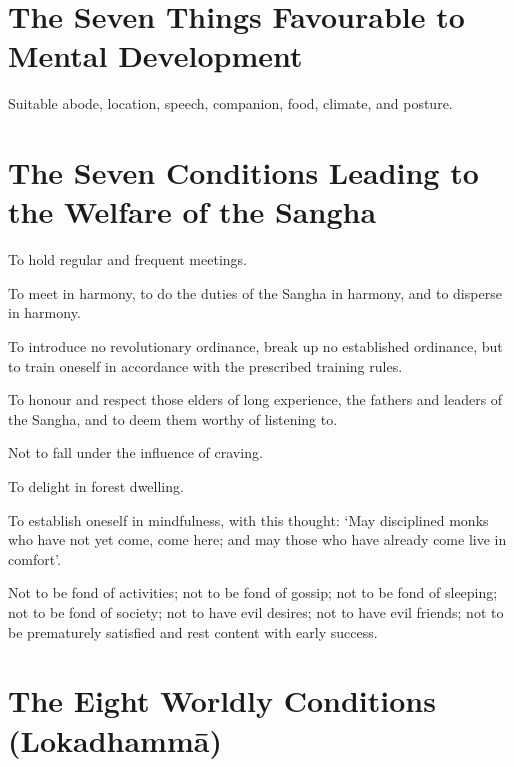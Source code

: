 
\ifhandbookedition
\vspace*{-\baselineskip}
\fi

\section*{The Seven Things Favourable to Mental Development}


Suitable abode, location, speech, companion, food, climate, and posture.


\ifhandbookedition
\vspace*{-\baselineskip}
\fi

\section*{The Seven Conditions Leading to the Welfare of the Sangha}

To hold regular and frequent meetings.

To meet in harmony, to do the duties of the Sangha in harmony, and to disperse
in harmony.

To introduce no revolutionary ordinance, break up no established ordinance, but
to train oneself in accordance with the prescribed training rules.

To honour and respect those elders of long experience, the fathers and leaders
of the Sangha, and to deem them worthy of listening to.

Not to fall under the influence of craving.

To delight in forest dwelling.

To establish oneself in mindfulness, with this thought: ‘May disciplined monks
who have not yet come, come here; and may those who have already come live in
comfort’.

Not to be fond of activities;
not to be fond of gossip;
not to be fond of sleeping;
not to be fond of society;
not to have evil desires;
not to have evil friends;
not to be prematurely satisfied and rest content with early success.


\ifhandbookedition
\vspace*{-\baselineskip}
\fi

\section*{The Eight Worldly Conditions (Lokadhammā)}


